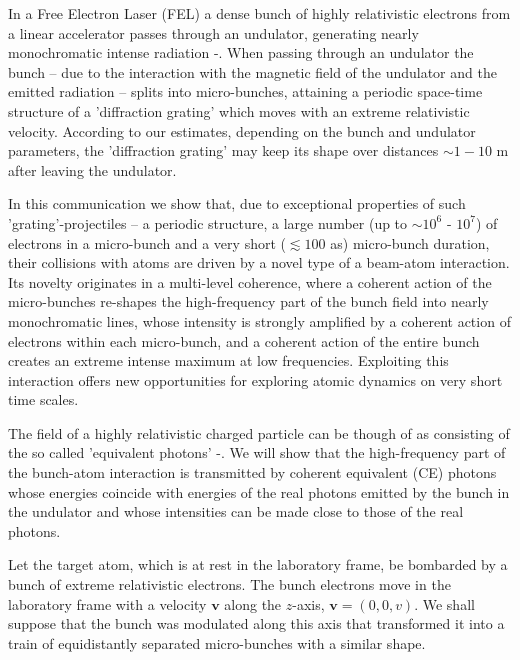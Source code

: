 \documentclass[prl, twocolumn, floatfix]{revtex4}
\begin{document}
In a Free Electron Laser (FEL) a dense bunch of highly relativistic electrons from
a linear accelerator passes through an undulator, generating nearly monochromatic
intense radiation \cite{FEL1}-\cite{fel-book}.
When passing through an undulator the bunch  --
due to the interaction with the magnetic field of the undulator and
the emitted radiation -- splits into micro-bunches, attaining a periodic space-time structure
of a 'diffraction grating' which moves with an extreme relativistic velocity.
According to our estimates, depending on the bunch and undulator parameters,
the 'diffraction grating' may keep its shape over distances
$ \sim 1 - 10 $ m after leaving the undulator.

In this communication we show that, due to exceptional properties of such 'grating'-projectiles
-- a periodic structure, a large number (up to $ \sim 10^6 $ - $ 10^7 $) of electrons
in a micro-bunch and a very short ($\lesssim 100 $ as) micro-bunch
duration, their collisions with atoms are driven by
a novel type of a beam-atom interaction.
Its novelty originates in a multi-level coherence,
where a coherent action of the micro-bunches re-shapes the high-frequency
part of the bunch field into nearly monochromatic lines, whose intensity
is strongly amplified by a coherent action of electrons within each micro-bunch,
and a coherent action of the entire bunch
creates an extreme intense
maximum at low frequencies. Exploiting this interaction
offers new opportunities for exploring atomic dynamics on very short time scales.

The field of a highly relativistic charged particle
can be though of as consisting of the so called 'equivalent photons' \cite{equiv-ph}-\cite{jack}.
We will show that the high-frequency part of the bunch-atom interaction is
transmitted by coherent equivalent (CE) photons
whose energies coincide with energies of the real photons
emitted by the bunch in the undulator and whose intensities
can be made close to those of the real photons.

Let the target atom, which is at rest in the laboratory frame,
be bombarded by a bunch of extreme relativistic electrons.
The bunch electrons move in the laboratory frame with a velocity $\bm v$ along
the $z$-axis, $\bm v = (0,0,v)$. We shall suppose that the bunch
was modulated along this axis that transformed it into
a train of equidistantly separated
micro-bunches with a similar shape.
\end{document}
